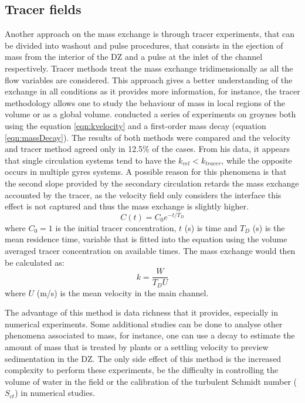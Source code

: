\subsection{Tracer fields}
Another approach on the mass exchange is through tracer experiments, that can be divided into washout and pulse procedures, that consists in the ejection of mass from the interior of the DZ and a pulse at the inlet of the channel respectively.  Tracer methods treat the mass exchange tridimensionally as all the flow variables are considered. This approach gives a better understanding of the exchange in all conditions as it provides more information, for instance, the tracer methodology allows one to study the behaviour of mass in local regions of the volume or as a global volume. \textcite{weitbrecht2004} conducted a series of experiments on groynes both using the equation \ref{eqn:kvelocity} and a first-order mass decay (equation \ref{eqn:massDecay}). The results of both methods were compared and the velocity and tracer method agreed only in 12.5\% of the cases. From his data, it appears that single circulation systems tend to have the $k_{vel} < k_{tracer}$, while the opposite occurs in multiple gyres systems. A possible reason for this phenomena is that the second slope provided by the secondary circulation retards the mass exchange accounted by the tracer, as the velocity field only considers the interface this effect is not captured and thus the mass exchange is slightly higher.
\begin{equation}
C(t)=C_0e^{-t/T_D}
\label{eqn:massDecay}
\end{equation}
where $C_0=1$ is the initial tracer concentration, $t$ (s) is time and $T_D$ (s) is the mean residence time, variable that is fitted into the equation using the volume averaged tracer concentration on available times. The mass exchange would then be calculated as:
\begin{equation}
k=\frac{W}{T_D U}
\label{eqn:ktracer}
\end{equation}
where $U$ (m/s) is the mean velocity in the main channel.

The advantage of this method is data richness that it provides, especially in numerical experiments. Some additional studies can be done to analyse other phenomena associated to mass, for instance, one can use a decay to estimate the amount of mass that is treated by plants or a settling velocity to preview sedimentation in the DZ. The only side effect of this method is the increased complexity to perform these experiments, be the difficulty in controlling the volume of water in the field or the calibration of the turbulent Schmidt number ($S_{ct}$) in numerical studies. 
